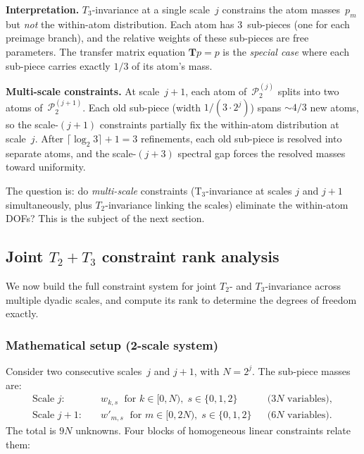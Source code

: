 \documentclass[11pt,a4paper]{article}
\begin{document}
\textbf{Interpretation.}
$T_3$-invariance at a single scale~$j$ constrains the atom masses~$p_m$
but \emph{not} the within-atom distribution.
Each atom has 3~sub-pieces (one for each preimage branch), and the
relative weights of these sub-pieces are free parameters.
The transfer matrix equation $\mathbf{T} p = p$ is the \emph{special case}
where each sub-piece carries exactly $1/3$ of its atom's mass.

\textbf{Multi-scale constraints.}
At scale~$j+1$, each atom of~$\mathcal{P}_2^{(j)}$ splits into two
atoms of~$\mathcal{P}_2^{(j+1)}$.  Each old sub-piece (width $1/(3 \cdot 2^j)$)
spans $\sim 4/3$ new atoms, so the scale-$(j+1)$ constraints
partially fix the within-atom distribution at scale~$j$.
After $\lceil \log_2 3 \rceil + 1 = 3$ refinements, each old sub-piece
is resolved into separate atoms, and the scale-$(j+3)$ spectral gap
forces the resolved masses toward uniformity.

The question is: do \emph{multi-scale} constraints (T$_3$-invariance
at scales $j$ and $j+1$ simultaneously, plus $T_2$-invariance
linking the scales) eliminate the within-atom DOFs?
This is the subject of the next section.


\subsection{Joint $T_2 + T_3$ constraint rank analysis}
\label{sec:lift}

We now build the full constraint system for joint $T_2$- and
$T_3$-invariance across multiple dyadic scales, and compute its rank
to determine the degrees of freedom exactly.

\subsubsection*{Mathematical setup (2-scale system)}

Consider two consecutive scales~$j$ and $j+1$, with $N = 2^j$.
The sub-piece masses are:
\begin{align*}
\text{Scale } j\!: &\quad w_{k,s} \;\text{ for }
  k \in [0, N),\; s \in \{0,1,2\}
  &&\text{($3N$ variables)}, \\
\text{Scale } j\!+\!1\!: &\quad w'_{m,s} \;\text{ for }
  m \in [0, 2N),\; s \in \{0,1,2\}
  &&\text{($6N$ variables)}.
\end{align*}
The total is $9N$ unknowns.
Four blocks of homogeneous linear constraints relate them:
\end{document}
